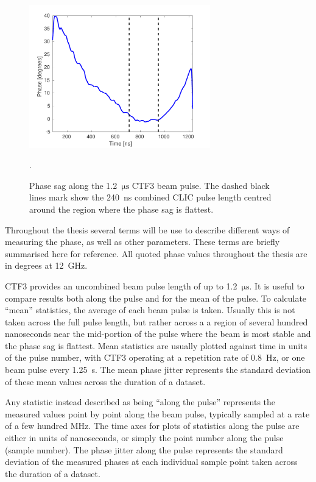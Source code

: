 \begin{figure}
  \centering
  \includegraphics[width=0.7\textwidth]{Figures/introduction/phaseSag}
  \caption{Phase sag along the 1.2~\(\mathrm{\mu s}\) CTF3 beam pulse. The dashed black lines mark show the 240~ns combined CLIC pulse length centred around the region where the phase sag is flattest.}.
  \label{f:ctfPhaseSag}
\end{figure}


Throughout the thesis several terms will be use to describe different ways of measuring the phase, as well as other parameters. These terms are briefly summarised here for reference. All quoted phase values throughout the thesis are in degrees at 12~GHz.

CTF3 provides an uncombined beam pulse length of up to 1.2~\(\mathrm{\mu s}\). It is useful to compare results both along the pulse and for the mean of the pulse. To calculate ``mean'' statistics, the average of each beam pulse is taken. Usually this is not taken across the full pulse length, but rather across a a region of several hundred nanoseconds near the mid-portion of the pulse where the beam is most stable and the phase sag is flattest. Mean statistics are usually plotted against time in units of the pulse number, with CTF3 operating at a repetition rate of 0.8~Hz, or one beam pulse every 1.25~s. The mean phase jitter represents the standard deviation of these mean values across the duration of a dataset.

Any statistic instead described as being ``along the pulse'' represents the measured values point by point along the beam pulse, typically sampled at a rate of a few hundred MHz. The time axes for plots of statistics along the pulse are either in units of nanoseconds, or simply the point number along the pulse (sample number). The phase jitter along the pulse represents the standard deviation of the measured phases at each individual sample point taken across the duration of a dataset.

